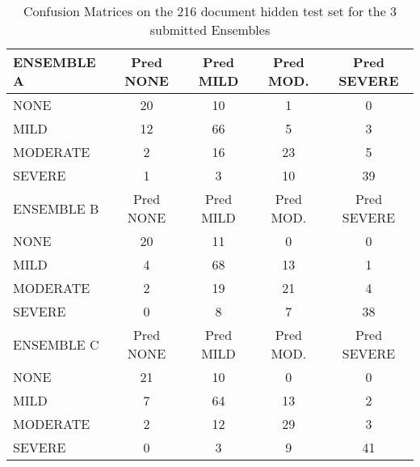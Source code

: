 \begin{table}
\centering
    \begin{tabular}{|l|c|c|c|c|}
       \hline
       \textsf{ \cellcolor{gray!15} ENSEMBLE A } & \textsf{ Pred NONE } & \textsf{ Pred MILD } & \textsf{ Pred MOD. } & \textsf{ Pred SEVERE } \\ 
       \hline
        \textsf{ NONE } & \cellcolor{gray!15} 20 & 10 & 1 & 0 \\ 
        \textsf{ MILD } & 12 & \cellcolor{gray!15} 66 & 5 & 3 \\ 
        \textsf{ MODERATE } & 2 & 16 & \cellcolor{gray!15} 23 & 5 \\ 
        \textsf{ SEVERE } & 1 & 3 & 10 & \cellcolor{gray!15} 39 \\ 
       \hline
       \textsf{ \cellcolor{gray!15} ENSEMBLE B } & \textsf{ Pred NONE } & \textsf{ Pred MILD } & \textsf{ Pred MOD. } & \textsf{ Pred SEVERE } \\ 
       \hline
        \textsf{ NONE } & \cellcolor{gray!15} 20 & 11 & 0 & 0 \\ 
        \textsf{ MILD } & 4 & \cellcolor{gray!15} 68 & 13 & 1 \\ 
        \textsf{ MODERATE } & 2 & 19 & \cellcolor{gray!15} 21 & 4 \\ 
        \textsf{ SEVERE } & 0 & 8 & 7 & \cellcolor{gray!15} 38 \\ 
       \hline
       \textsf{\cellcolor{gray!15} ENSEMBLE C } & \textsf{ Pred NONE } & \textsf{ Pred MILD } & \textsf{ Pred MOD. } & \textsf{ Pred SEVERE } \\ 
       \hline
        \textsf{ NONE } & \cellcolor{gray!15} 21 & 10 & 0 & 0 \\ 
        \textsf{ MILD } & 7 & \cellcolor{gray!15} 64 & 13 & 2 \\ 
        \textsf{ MODERATE } & 2 & 12 & \cellcolor{gray!15} 29 & 3 \\ 
        \textsf{ SEVERE } & 0 & 3 & 9 & \cellcolor{gray!15} 41 \\ 
       \hline
    \end{tabular}
    \caption{Confusion Matrices on the 216 document hidden test set for the 3 submitted Ensembles}
    \label{tab:EnsembleTestConfusionMatrix}
\end{table}


